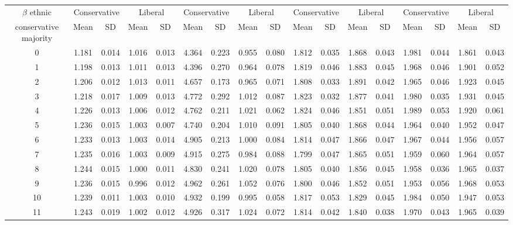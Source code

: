 \documentclass{article}
\begin{document}
\begin{table}[H]
{\begin{tabular}{|c|c|c|c|c|c|c|c|c|c|c|c|c|c|c|c|c|}
 $\beta$ ethnic & \multicolumn{2}{|c|}{Conservative} & \multicolumn{2}{|c|}{Liberal} 
& \multicolumn{2}{|c|}{Conservative} & \multicolumn{2}{|c|}{Liberal} & \multicolumn{2}{|c|}{Conservative} & \multicolumn{2}{|c|}{Liberal} 
& \multicolumn{2}{|c|}{Conservative} & \multicolumn{2}{|c|}{Liberal}\\
 conservative majority & Mean & SD & Mean & SD & Mean & SD & Mean & SD & Mean & SD & Mean & SD & Mean & SD & Mean & SD\\
 \hline
   0 & 1.181 & 0.014 & 1.016 & 0.013 & 4.364 & 0.223 & 0.955 & 0.080 & 1.812 & 0.035 & 1.868 & 0.043 & 1.981 & 0.044 & 1.861 & 0.043 \\ 
     1 & 1.198 & 0.013 & 1.011 & 0.013 & 4.396 & 0.270 & 0.964 & 0.078 & 1.819 & 0.046 & 1.883 & 0.045 & 1.968 & 0.046 & 1.901 & 0.052 \\ 
     2 & 1.206 & 0.012 & 1.013 & 0.011 & 4.657 & 0.173 & 0.965 & 0.071 & 1.808 & 0.033 & 1.891 & 0.042 & 1.965 & 0.046 & 1.923 & 0.045 \\ 
     3 & 1.218 & 0.017 & 1.009 & 0.013 & 4.772 & 0.292 & 1.012 & 0.087 & 1.823 & 0.032 & 1.877 & 0.041 & 1.980 & 0.035 & 1.931 & 0.045 \\ 
     4 & 1.226 & 0.013 & 1.006 & 0.012 & 4.762 & 0.211 & 1.021 & 0.062 & 1.824 & 0.046 & 1.851 & 0.051 & 1.989 & 0.053 & 1.920 & 0.061 \\ 
     5 & 1.236 & 0.015 & 1.003 & 0.007 & 4.740 & 0.204 & 1.010 & 0.091 & 1.805 & 0.040 & 1.868 & 0.044 & 1.964 & 0.040 & 1.952 & 0.047 \\ 
     6 & 1.233 & 0.013 & 1.003 & 0.014 & 4.905 & 0.213 & 1.000 & 0.084 & 1.814 & 0.047 & 1.866 & 0.047 & 1.967 & 0.044 & 1.956 & 0.057 \\ 
     7 & 1.235 & 0.016 & 1.003 & 0.009 & 4.915 & 0.275 & 0.984 & 0.088 & 1.799 & 0.047 & 1.865 & 0.051 & 1.959 & 0.060 & 1.964 & 0.057 \\ 
     8 & 1.244 & 0.015 & 1.000 & 0.011 & 4.830 & 0.241 & 1.020 & 0.078 & 1.805 & 0.040 & 1.856 & 0.045 & 1.958 & 0.036 & 1.965 & 0.037 \\ 
     9 & 1.236 & 0.015 & 0.996 & 0.012 & 4.962 & 0.261 & 1.052 & 0.076 & 1.800 & 0.046 & 1.852 & 0.051 & 1.953 & 0.056 & 1.968 & 0.053 \\ 
    10 & 1.239 & 0.011 & 1.003 & 0.010 & 4.932 & 0.199 & 0.995 & 0.058 & 1.817 & 0.053 & 1.829 & 0.045 & 1.984 & 0.050 & 1.947 & 0.053 \\ 
    11 & 1.243 & 0.019 & 1.002 & 0.012 & 4.926 & 0.317 & 1.024 & 0.072 & 1.814 & 0.042 & 1.840 & 0.038 & 1.970 & 0.043 & 1.965 & 0.039 \\ 

\end{tabular}}
\end{table}
\end{document}
